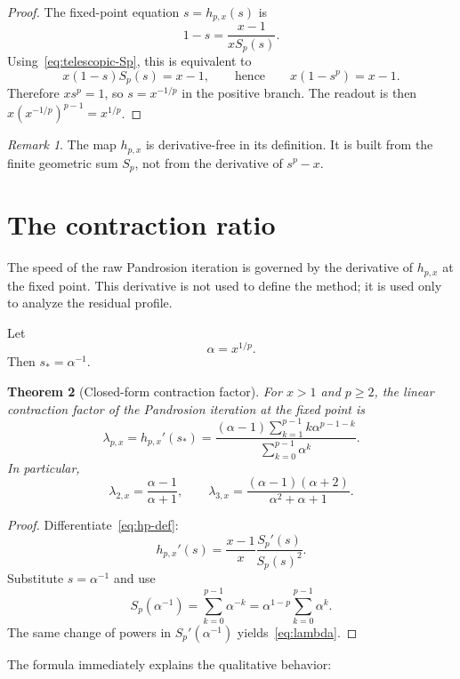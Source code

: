 \documentclass[11pt,a4paper]{article}
\theoremstyle{plain}
\newtheorem{theorem}{Theorem}[section]
\theoremstyle{definition}
\theoremstyle{remark}
\newtheorem{remark}[theorem]{Remark}
\newcommand{\Sp}{S_p}
\newcommand{\hp}{h_{p,x}}
\begin{document}
\begin{proof}
The fixed-point equation $s=\hp(s)$ is
\[
  1-s=\frac{x-1}{x\Sp(s)}.
\]
Using~\eqref{eq:telescopic-Sp}, this is equivalent to
\[
  x(1-s)\Sp(s)=x-1,
  \qquad\text{hence}\qquad
  x(1-s^p)=x-1.
\]
Therefore $xs^p=1$, so $s=x^{-1/p}$ in the positive branch.  The readout is
then $x(x^{-1/p})^{p-1}=x^{1/p}$.
\end{proof}

\begin{remark}
The map $\hp$ is derivative-free in its definition.  It is built from the
finite geometric sum $\Sp$, not from the derivative of $s^p-x$.
\end{remark}

\section{The contraction ratio}
\label{sec:lambda}

The speed of the raw Pandrosion iteration is governed by the derivative of
$\hp$ at the fixed point.  This derivative is not used to define the method; it
is used only to analyze the residual profile.

Let
\[
  \alpha=x^{1/p}.
\]
Then $s_*=\alpha^{-1}$.

\begin{theorem}[Closed-form contraction factor]
\label{thm:lambda}
For $x>1$ and $p\ge2$, the linear contraction factor of the Pandrosion
iteration at the fixed point is
\begin{equation}
  \lambda_{p,x}=\hp'(s_*)
  =\frac{(\alpha-1)\sum_{k=1}^{p-1}k\alpha^{p-1-k}}
         {\sum_{k=0}^{p-1}\alpha^k}.
  \label{eq:lambda}
\end{equation}
In particular,
\[
  \lambda_{2,x}=\frac{\alpha-1}{\alpha+1},
  \qquad
  \lambda_{3,x}=\frac{(\alpha-1)(\alpha+2)}{\alpha^2+\alpha+1}.
\]
\end{theorem}

\begin{proof}
Differentiate~\eqref{eq:hp-def}:
\[
  \hp'(s)=\frac{x-1}{x}\frac{\Sp'(s)}{\Sp(s)^2}.
\]
Substitute $s=\alpha^{-1}$ and use
\[
  \Sp(\alpha^{-1})
  =\sum_{k=0}^{p-1}\alpha^{-k}
  =\alpha^{1-p}\sum_{k=0}^{p-1}\alpha^k.
\]
The same change of powers in $\Sp'(\alpha^{-1})$ yields~\eqref{eq:lambda}.
\end{proof}

The formula immediately explains the qualitative behavior:
\end{document}
